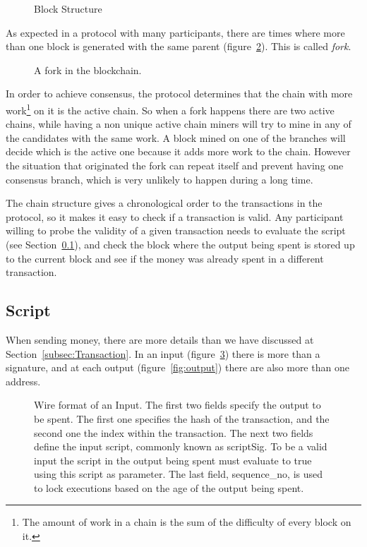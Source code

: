   \begin{figure}[ht]
	\centering
	
	\caption{Block Structure}
	\label{fig:block_pow}
\end{figure}

As expected in a protocol with many participants, there are times where more
  than one block is generated with the same parent
  (figure~\ref{fig:chain_fork}). This is called \textit{fork}.

\begin{figure}
	\centering
	\def\svgwidth{0.7\columnwidth}
	
	\caption{A fork in the blockchain.}
	\label{fig:chain_fork}
\end{figure}

In order to achieve consensus, the protocol determines that the chain with
  more work\footnote{The amount of work in a chain is the sum of the difficulty
  of every block on it.} on it is the active chain.
So when a fork happens there are two active chains, while having a non unique
  active chain miners will try to mine in any of the candidates with the same
  work.
A block mined on one of the branches will decide which is the active one
  because it adds more work to the chain. However the situation that originated
  the fork can repeat itself and prevent having one consensus branch, which is
  very unlikely \cite{decker2013information} to happen during a long time.

The chain structure gives a chronological order to the transactions in the
  protocol, so it makes it easy to check if a transaction is valid.
Any participant willing to probe the validity of a given transaction needs
  to evaluate the script (see Section~\ref{subsec:script}), and  check the block
  where the output being spent is stored up to the current block and see if the
  money was already spent in a different transaction.

  \subsection{Script} \label{subsec:script}

When sending money, there are more details than we have discussed at
  Section~\ref{subsec:Transaction}. In an input (figure~\ref{fig:input}) there
  is more than a signature, and at each output (figure~\ref{fig:output}) there
  are also more than one address.

\begin{figure}[ht]
  \centering
  
  \caption[Wire format of an Input.]{Wire format of an Input.
             The first two fields specify the output to be spent.
             The first one specifies the hash of the transaction,
               and the second one the index within the transaction.
             The next two fields define the input script, commonly known as
               scriptSig.
             To be a valid input the script in the output being spent must
               evaluate to true using this script as parameter.
             The last field, sequence\_no, is used to lock executions based on
             the age of the output being spent.
         }
  \label{fig:input}
\end{figure}

